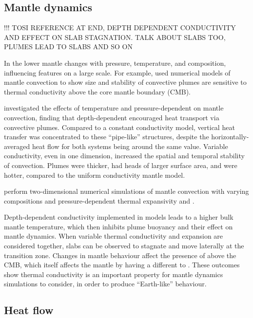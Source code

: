 \subsection{Mantle dynamics}

!!! TOSI REFERENCE AT END, DEPTH DEPENDENT CONDUCTIVITY AND EFFECT ON SLAB STAGNATION. TALK ABOUT SLABS TOO, PLUMES LEAD TO SLABS AND SO ON

In the lower mantle \tcs changes with pressure, temperature, and composition, influencing features on a large scale. For example, \citet{Naliboff2006} used numerical models of mantle convection to show size and stability of convective plumes are sensitive to thermal conductivity above the core mantle boundary (CMB).

\citet{Dubuffet2000} investigated the effects of temperature and pressure-dependent \tcs on mantle convection, finding that depth-dependent \tcs encouraged heat transport via convective plumes. Compared to a constant conductivity model, vertical heat transfer was concentrated to these ``pipe-like'' structures, despite the horizontally-averaged heat flow for both systems being around the same value. Variable conductivity, even in one dimension, increased the spatial and temporal stability of convection. Plumes were thicker, had heads of larger surface area, and were hotter, compared to the uniform conductivity mantle model.

\citet{Tosi2013} perform two-dimensional numerical simulations of mantle convection with varying compositions and pressure-dependent thermal expansivity and \tc. 


Depth-dependent conductivity implemented in models leads to a higher bulk mantle temperature, which then inhibits plume buoyancy and their effect on mantle dynamics. When variable thermal conductivity and expansion are considered together, slabs can be observed to stagnate and move laterally at the transition zone. Changes in mantle behaviour affect the presence of \ppvs above the CMB, which itself affects the mantle by having a different \tcs to \bdg. These outcomes show thermal conductivity is an important property for mantle dynamics simulations to consider, in order to produce “Earth-like” behaviour.



\subsection{Heat flow}

